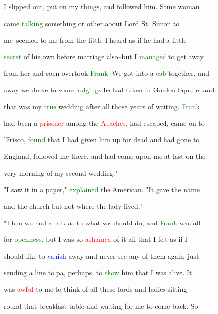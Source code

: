  I \textcolor{BurntOrange}{slipped} out, put on my things, and followed him. Some woman

 came \textcolor{green}{talking} something or other about \textcolor{BurntOrange}{Lord} St. Simon to

 me--seemed to me from the little I heard as if he had a little

 \textcolor{green}{secret} of his own before \textcolor{BurntOrange}{marriage} also--but I \textcolor{green}{managed} to get away

 from her and soon overtook \textcolor{green}{Frank.} We got into a \textcolor{green}{cab} together, and

 away we drove to some \textcolor{green}{lodgings} he had taken in Gordon Square, and

 that was my \textcolor{green}{true} wedding after all those years of \textcolor{BurntOrange}{waiting.} \textcolor{green}{Frank}

 had been a \textcolor{red}{prisoner} among the \textcolor{red}{Apaches,} had \textcolor{BurntOrange}{escaped,} came on to

 'Frisco, \textcolor{green}{found} that I had given him up for dead and had gone to

 England, followed me there, and had come upon me at last on the

 very morning of my second wedding."



 "I saw it in a paper," \textcolor{green}{explained} the American. "It gave the name

 and the \textcolor{BurntOrange}{church} but not where the lady lived."



 "Then we had a \textcolor{green}{talk} as to what we should do, and \textcolor{green}{Frank} was all

 for \textcolor{green}{openness,} but I was so \textcolor{red}{ashamed} of it all that I felt as if I

 should like to \textcolor{blue}{vanish} away and never see any of them again--just

 sending a line to pa, perhaps, to \textcolor{green}{show} him that I was \textcolor{BurntOrange}{alive.} It

 was \textcolor{red}{awful} to me to think of all those \textcolor{BurntOrange}{lords} and ladies sitting

 round that breakfast-table and \textcolor{BurntOrange}{waiting} for me to come back. So

